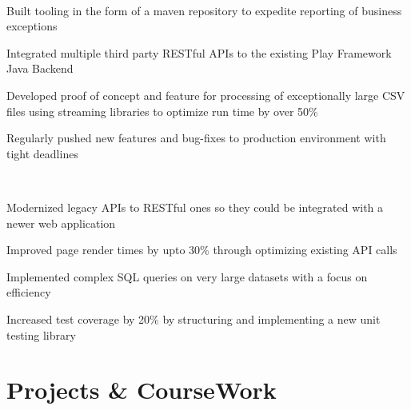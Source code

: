 \documentclass[]{hieudo-build}
\begin{document}
\begin{minipage}[t]{1.0\textwidth}
 \\
\begin{tightemize}
\item Built tooling in the form of a maven repository to expedite reporting of business exceptions
\item Integrated multiple third party RESTful APIs to the existing Play Framework Java Backend
\item Developed proof of concept and  feature for processing of exceptionally large CSV files using streaming libraries to optimize run time by over 50\% 
\item Regularly pushed new features and bug-fixes to production environment with tight deadlines
\end{tightemize}
\sectionsep

 \\
\begin{tightemize}
\item Modernized legacy APIs to RESTful ones so they could be integrated with a newer web application
\item Improved page render times by upto 30\% through optimizing existing API calls
\item Implemented complex SQL queries on very large datasets with a focus on efficiency 
\item  Increased test coverage by 20\% by structuring and implementing a new unit testing library
\end{tightemize}

\begin{center}
\end{center}





\section{Projects \& CourseWork}


\end{minipage}
\end{document}
